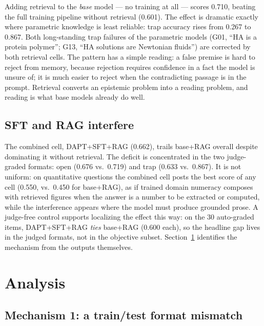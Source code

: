 \documentclass[11pt]{article}
\begin{document}
Adding retrieval to the \emph{base} model --- no training at all ---
scores 0.710, beating the full training pipeline without retrieval
(0.601). The effect is dramatic exactly where parametric knowledge is
least reliable: trap accuracy rises from 0.267 to 0.867. Both
long-standing trap failures of the parametric models (G01, ``HA is a
protein polymer''; G13, ``HA solutions are Newtonian fluids'') are
corrected by both retrieval cells. The pattern has a simple reading: a
false premise is hard to reject from memory, because rejection requires
confidence in a fact the model is unsure of; it is much easier to reject
when the contradicting passage is in the prompt. Retrieval converts an
epistemic problem into a reading problem, and reading is what base models
already do well.

\subsection{SFT and RAG interfere}

The combined cell, DAPT+SFT+RAG (0.662), trails base+RAG overall despite
dominating it without retrieval. The deficit is concentrated in the two
judge-graded formats: open (0.676 vs.\ 0.719) and trap (0.633
vs.\ 0.867). It is not uniform: on quantitative questions the combined
cell posts the best score of any cell (0.550, vs.\ 0.450 for base+RAG),
as if trained domain numeracy composes with retrieved figures when the
answer is a number to be extracted or computed, while the interference
appears where the model must produce grounded prose. A judge-free control
supports localizing the effect this way: on the 30 auto-graded items,
DAPT+SFT+RAG \emph{ties} base+RAG (0.600 each), so the headline gap lives
in the judged formats, not in the objective subset. Section~\ref{sec:analysis}
identifies the mechanism from the outputs themselves.

\section{Analysis}
\label{sec:analysis}

\subsection{Mechanism 1: a train/test format mismatch}
\end{document}
